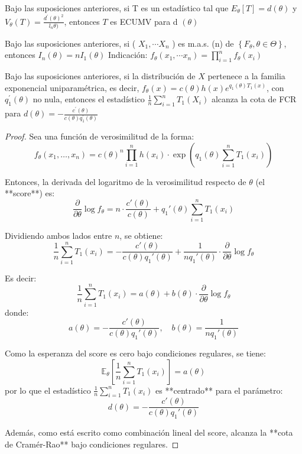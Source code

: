 \begin{corolario}
Bajo las suposiciones anteriores, si T es un estadístico tal que
$E_{\theta}[T]=d(\theta)$ y $V_{\theta}(T)=\frac{d^{\prime}(\theta)^{2}}{l_{n} \theta)}$, entonces $T$ es ECUMV para d $(\theta)$
\end{corolario}

\begin{corolario}
Bajo las suposiciones anteriores, si ( $X_{1}, \cdots X_{n}$ ) es
m.a.s. (n) de $\left\{F_{\theta}, \theta \in \Theta\right\}$, entonces
$I_{n}(\theta)=n I_{1}(\theta)$ Indicación: $f_{\theta}\left(x_{1}, \cdots
  x_{n}\right)=\prod_{i=1}^{n} f_{\theta}\left(x_{i}\right)$
\end{corolario}

\begin{proposición}
Bajo las suposiciones anteriores, si la distribución de $X$ pertenece a la familia exponencial uniparamétrica, es decir, $f_{\theta}(x)=c(\theta) h(x) e^{q_{1}(\theta) T_{1}(x)}$, con $q_{1}^{\prime}(\theta)$ no nula, entonces el estadístico $\frac{1}{n} \sum_{i=1}^{n} T_{1}\left(X_{i}\right)$ alcanza la cota de FCR para $d(\theta)=-\frac{c^{\prime}(\theta)}{c(\theta) q_{1}^{\prime}(\theta)}$
\end{proposición}

\begin{proof}
  Sea una función de verosimilitud de la forma:
  \[
  f_{\theta}\left(x_{1}, \ldots, x_{n}\right)
  = c(\theta)^n \prod_{i=1}^{n} h(x_i) \cdot \exp\left( q_1(\theta) \sum_{i=1}^{n} T_1(x_i) \right)
  \]
  
  Entonces, la derivada del logaritmo de la verosimilitud respecto de \(\theta\) (el **score**) es:
  \[
  \frac{\partial}{\partial \theta} \log f_{\theta}
  = n \cdot \frac{c'(\theta)}{c(\theta)} + q_1'(\theta) \sum_{i=1}^{n} T_1(x_i)
  \]
  
  Dividiendo ambos lados entre \(n\), se obtiene:
  \[
  \frac{1}{n} \sum_{i=1}^{n} T_1(x_i)
  = -\frac{c'(\theta)}{c(\theta) q_1'(\theta)} + \frac{1}{n q_1'(\theta)} \cdot \frac{\partial}{\partial \theta} \log f_{\theta}
  \]
  
  Es decir:
  \[
  \frac{1}{n} \sum_{i=1}^{n} T_1(x_i)
  = a(\theta) + b(\theta) \cdot \frac{\partial}{\partial \theta} \log f_{\theta}
  \]
  donde:
  \[
  a(\theta) = -\frac{c'(\theta)}{c(\theta) q_1'(\theta)}, \quad
  b(\theta) = \frac{1}{n q_1'(\theta)}
  \]
  
  Como la esperanza del score es cero bajo condiciones regulares, se tiene:
  \[
  \mathbb{E}_\theta\left[ \frac{1}{n} \sum_{i=1}^{n} T_1(x_i) \right] = a(\theta)
  \]
  por lo que el estadístico \(\frac{1}{n} \sum_{i=1}^{n} T_1(x_i)\) es **centrado** para el parámetro:
  \[
  d(\theta) = -\frac{c'(\theta)}{c(\theta) q_1'(\theta)}
  \]
  
  Además, como está escrito como combinación lineal del score, alcanza la **cota de Cramér-Rao** bajo condiciones regulares.
  \end{proof}
  

